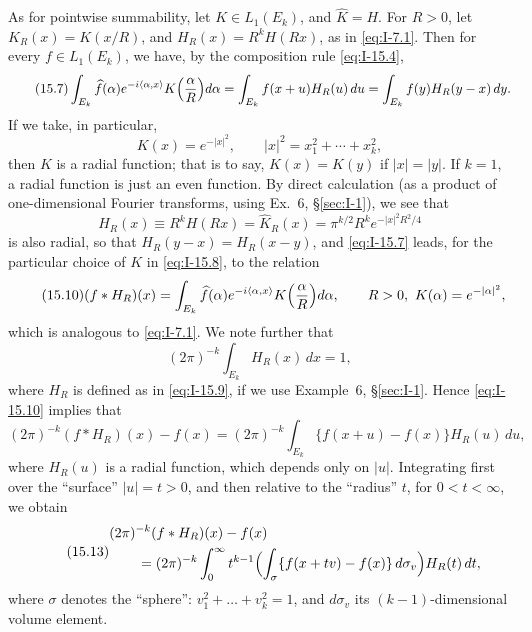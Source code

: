As for pointwise summability, let $K\in L_1(E_k)$, and $\widehat K=H$. For $R>0$, let $K_R(x)=K(x/R)$, and $H_R(x)=R^kH(Rx)$, as in \eqref{eq:I-7.1}. Then for every $f\in L_1(E_k)$, we have, by the composition rule \eqref{eq:I-15.4},
\begin{equation}\label{eq:I-15.7}\tag{15.7}
\int_{E_k}\widehat f(\alpha)e^{-i\langle\alpha,x\rangle}K\Bigl(\frac{\alpha}{R}\Bigr)d\alpha
=\int_{E_k}f(x+u)H_R(u)\,du
=\int_{E_k}f(y)H_R(y-x)\,dy.
\end{equation}
If we take, in particular,
\begin{equation}\label{eq:I-15.8}\tag{15.8}
K(x)=e^{-|x|^{2}},\qquad |x|^{2}=x_1^{2}+\cdots+x_k^{2},
\end{equation}
then $K$ is a radial function; that is to say, $K(x)=K(y)$ if $|x|=|y|$. If $k=1$, a radial function is just an even function. By direct calculation (as a product of one-dimensional Fourier transforms, using Ex.~6, \S\ref{sec:I-1}), we see that
\begin{equation}\label{eq:I-15.9}\tag{15.9}
H_R(x)\equiv R^kH(Rx)=\widehat K_R(x)=\pi^{k/2}R^ke^{-|x|^{2}R^{2}/4}
\end{equation}
is also radial, so that $H_R(y-x)=H_R(x-y)$, and \eqref{eq:I-15.7} leads, for the particular choice of $K$ in \eqref{eq:I-15.8}, to the relation
\begin{equation}\label{eq:I-15.10}\tag{15.10}
(f*H_R)(x)=\int_{E_k}\widehat f(\alpha)e^{-i\langle\alpha,x\rangle}K\Bigl(\frac{\alpha}{R}\Bigr)d\alpha,\qquad R>0,\ K(\alpha)=e^{-|\alpha|^{2}},
\end{equation}
which is analogous to \eqref{eq:I-7.1}. We note further that
\begin{equation}\label{eq:I-15.11}\tag{15.11}
(2\pi)^{-k}\int_{E_k}H_R(x)\,dx=1,
\end{equation}
where $H_R$ is defined as in \eqref{eq:I-15.9}, if we use Example~6, \S\ref{sec:I-1}. Hence \eqref{eq:I-15.10} implies that
\begin{equation}\label{eq:I-15.12}\tag{15.12}
(2\pi)^{-k}(f*H_R)(x)-f(x)=(2\pi)^{-k}\int_{E_k}\{f(x+u)-f(x)\}H_R(u)\,du,
\end{equation}
where $H_R(u)$ is a radial function, which depends only on $|u|$. Integrating first over the ``surface'' $|u|=t>0$, and then relative to the ``radius'' $t$, for $0<t<\infty$, we obtain
\begin{equation}\label{eq:I-15.13}\tag{15.13}
\begin{aligned}
&(2\pi)^{-k}(f*H_R)(x)-f(x)\\
&\qquad=(2\pi)^{-k}\int_{0}^{\infty}t^{k-1}\Bigl(\int_{\sigma}\{f(x+tv)-f(x)\}\,d\sigma_v\Bigr)H_R(t)\,dt,
\end{aligned}
\end{equation}
where $\sigma$ denotes the ``sphere'': $v_1^{2}+\ldots+v_k^{2}=1$, and $d\sigma_v$ its $(k-1)$-dimensional volume element.

